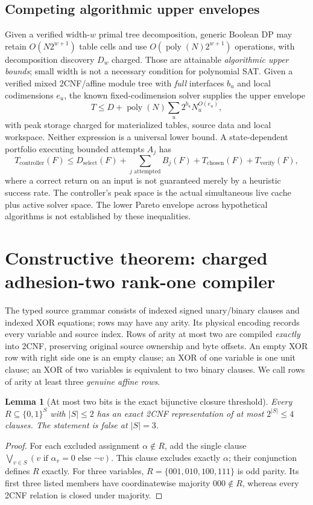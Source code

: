 \documentclass[10pt]{article}
\newtheorem{lemma}[theorem]{Lemma}
\begin{document}
\subsection{Competing algorithmic upper envelopes}
Given a verified width-$w$ primal tree decomposition, generic Boolean DP may retain $O(N2^{w+1})$ table cells and use $O(\operatorname{poly}(N)2^{w+1})$ operations, with decomposition discovery $D_w$ charged. Those are attainable \emph{algorithmic upper bounds}; small width is not a necessary condition for polynomial SAT. Given a verified mixed 2CNF/affine module tree with \emph{full} interfaces $b_u$ and local codimensions $e_u$, the known fixed-codimension solver supplies the upper envelope
\[
 T\le D+\operatorname{poly}(N)\sum_u 2^{b_u}N_u^{O(e_u)},
\]
with peak storage charged for materialized tables, source data and local workspace. Neither expression is a universal lower bound. A state-dependent portfolio executing bounded attempts $A_j$ has
\[
 T_{\mathrm{controller}}(F)\le D_{\mathrm{select}}(F)+\sum_{j\text{ attempted}}B_j(F)
   +T_{\mathrm{chosen}}(F)+T_{\mathrm{verify}}(F),
\]
where a correct return on an input is not guaranteed merely by a heuristic success rate. The controller's peak space is the actual simultaneous live cache plus active solver space. The lower Pareto envelope across hypothetical algorithms is not established by these inequalities.

\section{Constructive theorem: charged adhesion-two rank-one compiler}
The typed source grammar consists of indexed signed unary/binary clauses and indexed XOR equations; rows may have any arity. Its physical encoding records every variable and source index. Rows of arity at most two are compiled \emph{exactly} into 2CNF, preserving original source ownership and byte offsets. An empty XOR row with right side one is an empty clause; an XOR of one variable is one unit clause; an XOR of two variables is equivalent to two binary clauses. We call rows of arity at least three \emph{genuine affine rows}.

\begin{lemma}[At most two bits is the exact bijunctive closure threshold]\label{lem:2cnf}
Every $R\subseteq\{0,1\}^S$ with $|S|\le2$ has an exact 2CNF representation of at most $2^{|S|}\le4$ clauses. The statement is false at $|S|=3$.
\end{lemma}
\begin{proof}For each excluded assignment $\alpha\notin R$, add the single clause $\bigvee_{v\in S}(v\text{ if }\alpha_v=0\text{ else }\neg v)$. This clause excludes exactly $\alpha$; their conjunction defines $R$ exactly. For three variables, $R=\{001,010,100,111\}$ is odd parity. Its first three listed members have coordinatewise majority $000\notin R$, whereas every 2CNF relation is closed under majority.\end{proof}
\end{document}
